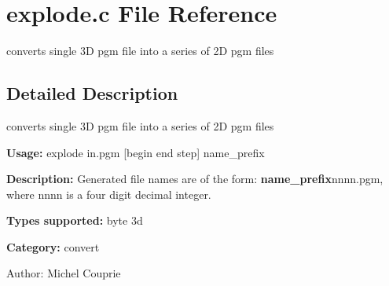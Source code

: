 \section{explode.c File Reference}
\label{explode_8c}
converts single 3D pgm file into a series of 2D pgm files  




\label{_details}
\subsection{Detailed Description}
converts single 3D pgm file into a series of 2D pgm files 

{\bf Usage:} explode in.pgm [begin end step] name\_\-prefix

{\bf Description:} Generated file names are of the form: {\bf name\_\-prefix}nnnn.pgm, where nnnn is a four digit decimal integer.

{\bf Types supported:} byte 3d

{\bf Category:} convert

\begin{Desc}
\item[Author:]Michel Couprie \end{Desc}

